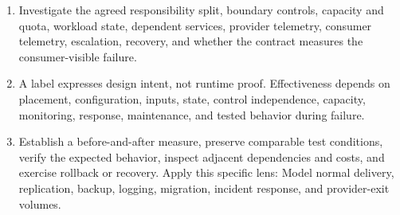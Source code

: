 \documentclass[11pt]{article}
\begin{document}
\begin{enumerate}
\item Investigate the agreed responsibility split, boundary controls, capacity and quota, workload state, dependent services, provider telemetry, consumer telemetry, escalation, recovery, and whether the contract measures the consumer-visible failure.
\item A label expresses design intent, not runtime proof. Effectiveness depends on placement, configuration, inputs, state, control independence, capacity, monitoring, response, maintenance, and tested behavior during failure.
\item Establish a before-and-after measure, preserve comparable test conditions, verify the expected behavior, inspect adjacent dependencies and costs, and exercise rollback or recovery. Apply this specific lens: Model normal delivery, replication, backup, logging, migration, incident response, and provider-exit volumes.
\end{enumerate}
\end{document}
